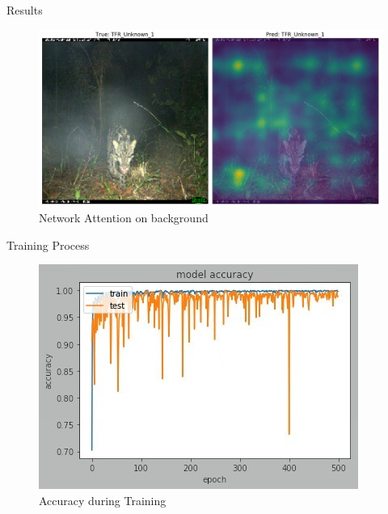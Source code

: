 \documentclass[10pt]{beamer}
\begin{document}


\begin{frame}{Results}
	\centering
	\begin{figure}
		\includegraphics[width=\columnwidth]{images/result_leo_2.png}
		\caption{Network Attention on background}
	\end{figure}
\end{frame}


\begin{frame}{Training Process}
	\centering
	\begin{figure}
		\includegraphics[width=.9\columnwidth,height=\textheight,keepaspectratio]{images/Pretrain_acc_ResNet50_cropped_heavy_augment_lr0_0001.jpg}
		\caption{Accuracy during Training}
	\end{figure}
\end{frame}

\end{document}
